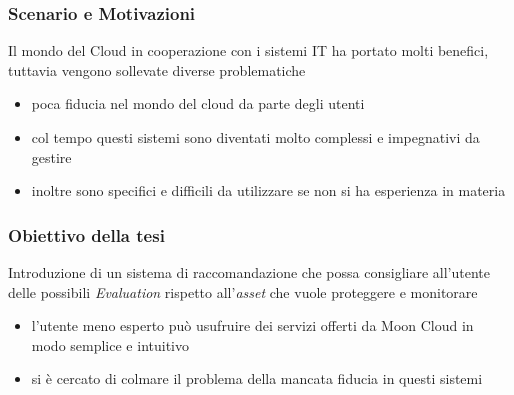 \frame{\titlepage}

\begin{frame}
    \frametitle{Scenario e Motivazioni}
    Il mondo del Cloud in cooperazione con i sistemi IT ha portato molti benefici, tuttavia vengono sollevate diverse problematiche
    \begin{itemize}
        \item \alert{poca fiducia} nel mondo del cloud da parte degli utenti
        \item col tempo questi sistemi sono diventati molto \alert{complessi e impegnativi da gestire}
        \item inoltre sono specifici e \alert{difficili da utilizzare} se non si ha esperienza in materia
    \end{itemize}
\end{frame}

\begin{frame}
    \frametitle{Obiettivo della tesi}
    Introduzione di un \alert{sistema di raccomandazione} che possa consigliare all'utente delle possibili \textit{Evaluation} rispetto 
    all'\textit{asset} che vuole proteggere e monitorare
    \begin{itemize}
        \item l'utente meno esperto può usufruire dei servizi offerti da Moon Cloud in modo \alert{semplice} e \alert{intuitivo}
        \item si è cercato di colmare il problema della mancata fiducia in questi sistemi
    \end{itemize}
\end{frame}

